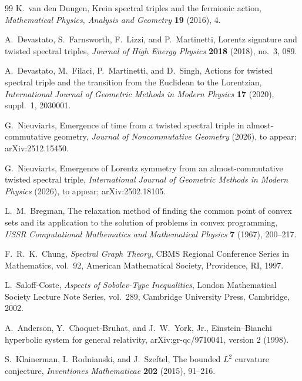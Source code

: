 \documentclass[11pt]{article}
\theoremstyle{definition}
\theoremstyle{remark}
\begin{document}
\begin{thebibliography}{99}
K.~van den Dungen,
\newblock Krein spectral triples and the fermionic action,
\newblock \emph{Mathematical Physics, Analysis and Geometry}
\textbf{19} (2016), 4.

A.~Devastato, S.~Farnsworth, F.~Lizzi, and P.~Martinetti,
\newblock Lorentz signature and twisted spectral triples,
\newblock \emph{Journal of High Energy Physics} \textbf{2018} (2018),
no.~3, 089.

A.~Devastato, M.~Filaci, P.~Martinetti, and D.~Singh,
\newblock Actions for twisted spectral triple and the transition from the
Euclidean to the Lorentzian,
\newblock \emph{International Journal of Geometric Methods in Modern Physics}
\textbf{17} (2020), suppl.~1, 2030001.

G.~Nieuviarts,
\newblock Emergence of time from a twisted spectral triple in
almost-commutative geometry,
\newblock \emph{Journal of Noncommutative Geometry} (2026), to appear;
arXiv:2512.15450.

G.~Nieuviarts,
\newblock Emergence of Lorentz symmetry from an almost-commutative twisted
spectral triple,
\newblock \emph{International Journal of Geometric Methods in Modern Physics}
(2026), to appear; arXiv:2502.18105.

L.~M.~Bregman,
\newblock The relaxation method of finding the common point of convex sets and
its application to the solution of problems in convex programming,
\newblock \emph{USSR Computational Mathematics and Mathematical Physics}
\textbf{7} (1967), 200--217.

F.~R.~K.~Chung,
\newblock \emph{Spectral Graph Theory},
\newblock CBMS Regional Conference Series in Mathematics, vol.~92,
American Mathematical Society, Providence, RI, 1997.

L.~Saloff-Coste,
\newblock \emph{Aspects of Sobolev-Type Inequalities},
\newblock London Mathematical Society Lecture Note Series, vol.~289,
Cambridge University Press, Cambridge, 2002.

A.~Anderson, Y.~Choquet-Bruhat, and J.~W.~York, Jr.,
\newblock Einstein--Bianchi hyperbolic system for general relativity,
\newblock arXiv:gr-qc/9710041, version 2 (1998).

S.~Klainerman, I.~Rodnianski, and J.~Szeftel,
\newblock The bounded $L^2$ curvature conjecture,
\newblock \emph{Inventiones Mathematicae} \textbf{202} (2015), 91--216.


\end{thebibliography}
\end{document}
